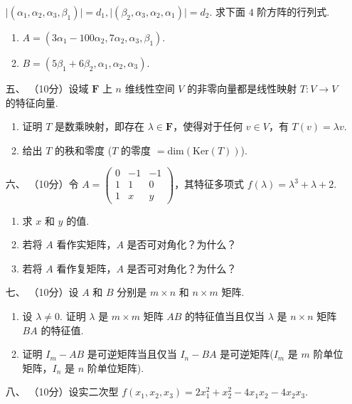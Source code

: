 \begin{enumerate}
    $\lvert (\alpha_1,\alpha_2,\alpha_3,\beta_1) \rvert=d_1,\lvert (\beta_2,\alpha_3,\alpha_2,\alpha_1) \rvert = d_2.$ 求下面 $4$ 阶方阵的行列式.
    \begin{enumerate}[label=(\arabic*)]
        \item $A=(3\alpha_1-100\alpha_2,7\alpha_2,\alpha_3,\beta_1).$
        \item $B=(5\beta_1+6\beta_2,\alpha_1,\alpha_2,\alpha_3).$
    \end{enumerate}
    \item [五、]（10分）设域 $\mathbf{F}$ 上 $n$ 维线性空间 $V$ 的非零向量都是线性映射 $T:V\to V$ 的特征向量.
    \begin{enumerate}[label=(\arabic*)]
        \item 证明 $T$ 是数乘映射，即存在 $\lambda \in \mathbf{F}$，使得对于任何 $v \in V$，有 $T(v)=\lambda v.$
        \item 给出 $T$ 的秩和零度 ($T$ 的零度 $=\mathrm{dim}(\mathrm{Ker}(T))$).
    \end{enumerate}
    \item [六、]（10分）令 $A=\begin{pmatrix}0 & -1 & -1 \\ 1 & 1 & 0 \\ 1 & x & y\end{pmatrix}$，其特征多项式 $f(\lambda) = \lambda^3+\lambda+2.$
    \begin{enumerate}[label=(\arabic*)]
        \item 求 $x$ 和 $y$ 的值.
        \item 若将 $A$ 看作实矩阵，$A$ 是否可对角化？为什么？
        \item 若将 $A$ 看作复矩阵，$A$ 是否可对角化？为什么？
    \end{enumerate}
    \item [七、]（10分）设 $A$ 和 $B$ 分别是 $m\times n$ 和 $n\times m$ 矩阵.
    \begin{enumerate}[label=(\arabic*)]
        \item 设 $\lambda \neq 0$. 证明 $\lambda$ 是 $m\times m$ 矩阵 $AB$ 的特征值当且仅当 $\lambda$ 是 $n\times n$ 矩阵 $BA$ 的特征值.
        \item 证明 $I_m-AB$ 是可逆矩阵当且仅当 $I_n-BA$ 是可逆矩阵($I_m$ 是 $m$ 阶单位矩阵，$I_n$ 是 $n$ 阶单位矩阵).
    \end{enumerate}
    \item [八、]（10分）设实二次型 $f(x_1,x_2,x_3) = 2x_1^2+x_2^2-4x_1x_2-4x_2x_3.$
    \begin{enumerate}[label=(\arabic*)]

\end{enumerate}
\end{enumerate}
